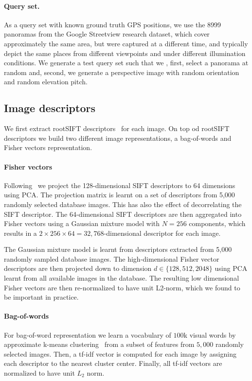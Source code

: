         \paragraph{Query set.}
        As a query set with known ground truth GPS positions, we use the 8999 panoramas from the Google Streetview research dataset, which cover approximately the same area, but were captured at a different time, and typically depict the same places from different viewpoints and under different illumination conditions. We generate a test query set such that we , first, select a panorama at random and, second, we generate a perspective image with random orientation and random elevation pitch. 


       \subsection{Image descriptors}
        We first extract rootSIFT descriptors~\cite{Arandjelovic12} for each image. On top od rootSIFT descriptors we build two different image representations, a bag-of-words and Fisher vectors representation.

        \paragraph{Fisher vectors}
        Following~\cite{Jegou12} we project the 128-dimensional SIFT descriptors to 64 dimensions using PCA. The projection matrix is learnt on a set of descriptors from 5,000 randomly selected database images. This has also the effect of decorrelating the SIFT descriptor. The 64-dimensional SIFT descriptors are then aggregated into Fisher vectors using a Gaussian mixture model with $N=256$ components, which results in a $2\times256\times64 = 32,768$-dimensional descriptor for each image.  
      
        The Gaussian mixture model is learnt from descriptors extracted from 5,000 randomly sampled database images. The  high-dimensional Fisher vector descriptors are then projected down to dimension $d\in\{128,512, 2048\}$ using PCA learnt from all available images in the database. The resulting low dimensional Fisher vectors are then re-normalized to have unit L2-norm, which we found to be important in practice.

        \paragraph{Bag-of-words}
        For bag-of-word representation we learn a vocabulary of $100$k visual words by approximate k-means clustering~\cite{Philbin07} from a subset of features from $5,000$ randomly selected images. Then, a tf-idf vector is computed for each image by assigning each descriptor to the nearest cluster center.  Finally, all tf-idf vectors are normalized to have unit $L_2$ norm.

